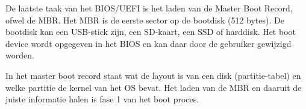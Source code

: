 De laatste taak van het BIOS/UEFI is het laden van de Master Boot Record, ofwel de MBR. Het MBR is de eerste sector op de bootdisk (512 bytes). De bootdisk kan een USB-stick zijn, een SD-kaart, een SSD of harddisk. Het boot device wordt opgegeven in het BIOS en kan daar door de gebruiker gewijzigd worden.

In het master boot record staat wat de layout is van een disk (partitie-tabel) en welke partitie de kernel van het OS bevat. Het laden van de MBR en daaruit de juiste informatie halen is fase 1 van het boot proces.

